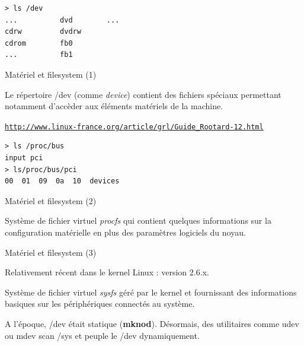 \documentclass[12pt, t]{beamer}
\newcommand{\myhref}[1]{\href{#1}{\tt \tiny #1}}
\begin{document}
{
    \begin{lstlisting}
> ls /dev
...          dvd        ...
cdrw         dvdrw
cdrom        fb0
...          fb1
    \end{lstlisting}
}

\begin{frame}{Matériel et filesystem (1)}

    \vspace{20pt}
    Le répertoire /dev (comme \textit{device}) contient des fichiers spéciaux
    permettant notamment d'accèder aux éléments matériels de la machine.

    {
        \vspace{20pt}
        \lstdev

        \centering
        \myhref{http://www.linux-france.org/article/grl/Guide\_Rootard-12.html}
    }
\end{frame}

{
    \begin{lstlisting}
> ls /proc/bus
input pci
> ls/proc/bus/pci
00  01  09  0a  10  devices
    \end{lstlisting}
}

\begin{frame}{Matériel et filesystem (2)}

    \vspace{20pt}
    Système de fichier virtuel {\textit{procfs}} qui contient quelques
    informations sur la configuration matérielle en plus des paramètres
    logiciels du noyau.

    \vspace{20pt}
    \lstproc

\end{frame}

\begin{frame}{Matériel et filesystem (3)}

    \vspace{20pt}
    Relativement récent dans le kernel Linux : version 2.6.x.

    {
        \vspace{20pt}
        Système de fichier virtuel {\textit{sysfs}} géré par le kernel et
        fournissant des informations basiques sur les périphériques connectés
        au système.
    }

    {
        \vspace{20pt}
        A l'époque, /dev était statique ({\textbf{mknod}}). Désormais, des
        utilitaires comme udev ou mdev scan /sys et peuple le /dev dynamiquement.
    }

\end{frame}
\end{document}
